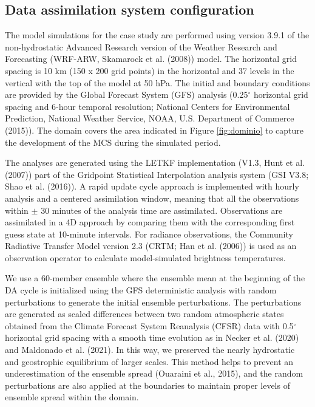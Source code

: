 \documentclass[final,5p,times,twocolumn,authoryear]{elsarticle} %
\begin{document}
\hypertarget{config}{%
\subsection{Data assimilation system configuration}\label{config}}

The model simulations for the case study are performed using version 3.9.1 of the non-hydrostatic Advanced Research version of the Weather Research and Forecasting (WRF-ARW, Skamarock et al. (2008)) model.
The horizontal grid spacing is 10 km (150 x 200 grid points) in the horizontal and 37 levels in the vertical with the top of the model at 50 hPa.
The initial and boundary conditions are provided by the Global Forecast System (GFS) analysis (0.25\(^{\circ}\) horizontal grid spacing and 6-hour temporal resolution; National Centers for Environmental Prediction, National Weather Service, NOAA, U.S. Department of Commerce (2015)).
The domain covers the area indicated in Figure \ref{fig:dominio} to capture the development of the MCS during the simulated period.

The analyses are generated using the LETKF implementation (V1.3, Hunt et al. (2007)) part of the Gridpoint Statistical Interpolation analysis system (GSI V3.8; Shao et al. (2016)).
A rapid update cycle approach is implemented with hourly analysis and a centered assimilation window, meaning that all the observations within \(\pm\) 30 minutes of the analysis time are assimilated.
Observations are assimilated in a 4D approach by comparing them with the corresponding first guess state at 10-minute intervals.
For radiance observations, the Community Radiative Transfer Model version 2.3 (CRTM; Han et al. (2006)) is used as an observation operator to calculate model-simulated brightness temperatures.

We use a 60-member ensemble where the ensemble mean at the beginning of the DA cycle is initialized using the GFS deterministic analysis with random perturbations to generate the initial ensemble perturbations. The perturbations are generated as scaled differences between two random atmospheric states obtained from the Climate Forecast System Reanalysis (CFSR) data with 0.5\(^{\circ}\) horizontal grid spacing with a smooth time evolution as in Necker et al. (2020) and Maldonado et al. (2021). In this way, we preserved the nearly hydrostatic and geostrophic equilibrium of larger scales. This method helps to prevent an underestimation of the ensemble spread (Ouaraini et al., 2015), and the random perturbations are also applied at the boundaries to maintain proper levels of ensemble spread within the domain.
\end{document}
